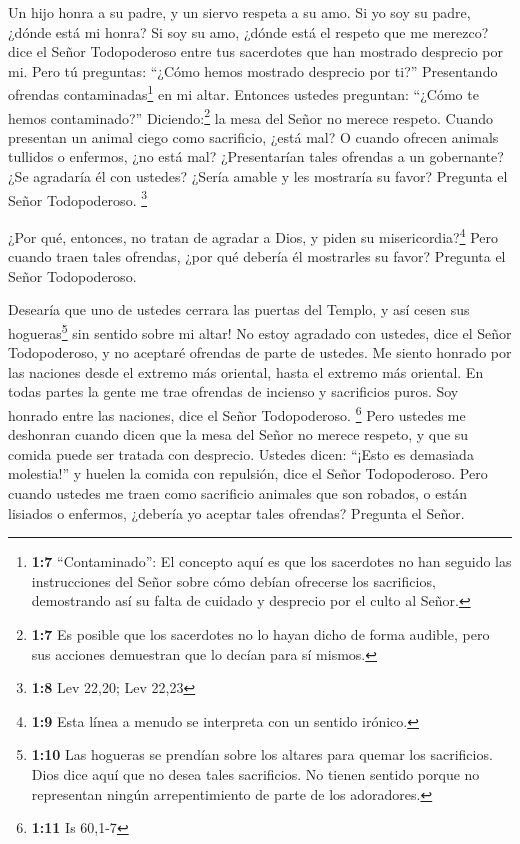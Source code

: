 Un hijo honra a su padre, y un siervo respeta a su amo.
Si yo soy su padre, ¿dónde está mi honra? Si soy su amo, ¿dónde está el
respeto que me merezco? dice el Señor Todopoderoso entre tus sacerdotes
que han mostrado desprecio por mi. Pero tú preguntas: ``¿Cómo hemos
mostrado desprecio por ti?''  Presentando ofrendas
contaminadas\footnote{\textbf{1:7} ``Contaminado'': El concepto aquí es
  que los sacerdotes no han seguido las instrucciones del Señor sobre
  cómo debían ofrecerse los sacrificios, demostrando así su falta de
  cuidado y desprecio por el culto al Señor.} en mi altar. Entonces
ustedes preguntan: ``¿Cómo te hemos contaminado?'' Diciendo:\footnote{\textbf{1:7}
  Es posible que los sacerdotes no lo hayan dicho de forma audible, pero
  sus acciones demuestran que lo decían para sí mismos.} la mesa del
Señor no merece respeto.  Cuando presentan un animal ciego
como sacrificio, ¿está mal? O cuando ofrecen animals tullidos o
enfermos, ¿no está mal? ¿Presentarían tales ofrendas a un gobernante?
¿Se agradaría él con ustedes? ¿Sería amable y les mostraría su favor?
Pregunta el Señor Todopoderoso. \footnote{\textbf{1:8} Lev 22,20; Lev
  22,23}

 ¿Por qué, entonces, no tratan de agradar a Dios, y piden
su misericordia?\footnote{\textbf{1:9} Esta línea a menudo se interpreta
  con un sentido irónico.} Pero cuando traen tales ofrendas, ¿por qué
debería él mostrarles su favor? Pregunta el Señor Todopoderoso.

 Desearía que uno de ustedes cerrara las puertas del
Templo, y así cesen sus hogueras\footnote{\textbf{1:10} Las hogueras se
  prendían sobre los altares para quemar los sacrificios. Dios dice aquí
  que no desea tales sacrificios. No tienen sentido porque no
  representan ningún arrepentimiento de parte de los adoradores.} sin
sentido sobre mi altar! No estoy agradado con ustedes, dice el Señor
Todopoderoso, y no aceptaré ofrendas de parte de ustedes.
 Me siento honrado por las naciones desde el extremo más
oriental, hasta el extremo más oriental. En todas partes la gente me
trae ofrendas de incienso y sacrificios puros. Soy honrado entre las
naciones, dice el Señor Todopoderoso. \footnote{\textbf{1:11} Is 60,1-7}
 Pero ustedes me deshonran cuando dicen que la mesa del
Señor no merece respeto, y que su comida puede ser tratada con
desprecio.  Ustedes dicen: ``¡Esto es demasiada
molestia!'' y huelen la comida con repulsión, dice el Señor
Todopoderoso. Pero cuando ustedes me traen como sacrificio animales que
son robados, o están lisiados o enfermos, ¿debería yo aceptar tales
ofrendas? Pregunta el Señor.

